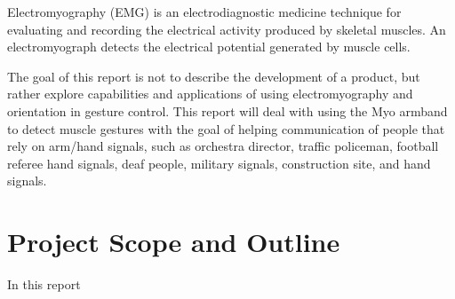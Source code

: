 \begin{sloppypar}
Electromyography (EMG) is an electrodiagnostic medicine technique for evaluating and recording the electrical activity produced by skeletal muscles. An electromyograph detects the electrical potential generated by muscle cells.
\end{sloppypar}

The goal of this report is not to describe the development of a product, but rather explore capabilities and applications of using electromyography and orientation in gesture control. This report will deal with using the Myo armband to detect muscle gestures with the goal of helping communication of people that rely on arm/hand signals, such as orchestra director, traffic policeman, football referee hand signals, deaf people, military signals, construction site, and hand signals.

\section{Project Scope and Outline}
\label{sec:project_scop_and_outline}
In this report